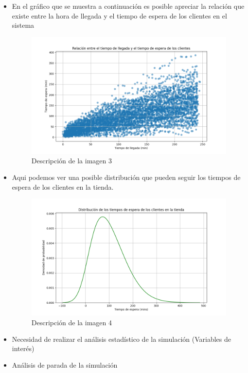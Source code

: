 \documentclass[
]{article}
\begin{document}
\begin{itemize}
\item
  En el gráfico que se muestra a continuación es posible apreciar la
  relación que existe entre la hora de llegada y el tiempo de espera de
  los clientes en el sistema 
\begin{figure}[!h] \centering \includegraphics{mi_grafica3.png} \caption{Descripción de la imagen 3} \label{fig:mi_grafica3} \end{figure}
\item
  Aqui podemos ver una posible distribución que pueden seguir los
  tiempos de espera de los clientes en la tienda.
\begin{figure}[!h] \centering \includegraphics{mi_grafica4.png} \caption{Descripción de la imagen 4} \label{fig:mi_grafica4} \end{figure}

\item
  Necesidad de realizar el análisis estadístico de la simulación
  (Variables de interés)
\item
  Análisis de parada de la simulación


\end{itemize}
\end{document}
